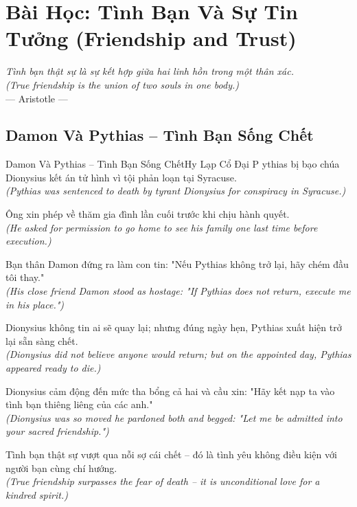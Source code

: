 \chapter{Bài Học: Tình Bạn Và Sự Tin Tưởng (Friendship and Trust)}
\begin{center}
  \textit{\color{truyenblue}Tình bạn thật sự là sự kết hợp giữa hai linh hồn trong một thân xác.}\\
  \textit{(True friendship is the union of two souls in one body.)}\\[4pt]
  \small\color{truyengold}--- Aristotle ---
\end{center}
\ngancach

\section{Damon Và Pythias -- Tình Bạn Sống Chết}
\begin{truyen}{Damon Và Pythias -- Tình Bạn Sống Chết}{Hy Lạp Cổ Đại}
P ythias bị bạo chúa Dionysius kết án tử hình vì tội phản loạn tại Syracuse.\\
\textit{(Pythias was sentenced to death by tyrant Dionysius for conspiracy in Syracuse.)}

Ông xin phép về thăm gia đình lần cuối trước khi chịu hành quyết.\\
\textit{(He asked for permission to go home to see his family one last time before execution.)}

Bạn thân Damon đứng ra làm con tin: "Nếu Pythias không trở lại, hãy chém đầu tôi thay."\\
\textit{(His close friend Damon stood as hostage: "If Pythias does not return, execute me in his place.")}

Dionysius không tin ai sẽ quay lại; nhưng đúng ngày hẹn, Pythias xuất hiện trở lại sẵn sàng chết.\\
\textit{(Dionysius did not believe anyone would return; but on the appointed day, Pythias appeared ready to die.)}

Dionysius cảm động đến mức tha bổng cả hai và cầu xin: "Hãy kết nạp ta vào tình bạn thiêng liêng của các anh."\\
\textit{(Dionysius was so moved he pardoned both and begged: "Let me be admitted into your sacred friendship.")}

\end{truyen}
\begin{baihoc}
  Tình bạn thật sự vượt qua nỗi sợ cái chết -- đó là tình yêu không điều kiện với người bạn cùng chí hướng.\\
  \textit{(True friendship surpasses the fear of death -- it is unconditional love for a kindred spirit.)}
\end{baihoc}

